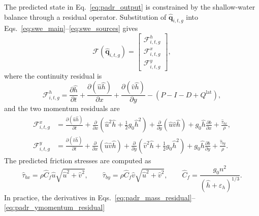 \documentclass[pdflatex,sn-mathphys-ay]{sn-jnl}
\theoremstyle{thmstyleone}
\begin{document}
The predicted state in Eq.~\eqref{eq:padr_output} is constrained by
the shallow-water balance through a residual operator.  Substitution of
$\hat{\mathbf{q}}_{i,t,g}$ into
Eqs.~\eqref{eq:swe_main}--\eqref{eq:swe_sources} gives
\begin{equation}
  \mathcal{F}
  \left(
    \hat{\mathbf{q}}_{i,t,g}
  \right)
  =
  \begin{bmatrix}
    \mathcal{F}^{h}_{i,t,g} \\
    \mathcal{F}^{x}_{i,t,g} \\
    \mathcal{F}^{y}_{i,t,g}
  \end{bmatrix},
  \label{eq:padr_residual_vector}
\end{equation}
where the continuity residual is
\begin{equation}
  \mathcal{F}^{h}_{i,t,g}
  =
  \frac{\partial \hat{h}}{\partial t}
  +
  \frac{\partial (\hat{u}\hat{h})}{\partial x}
  +
  \frac{\partial (\hat{v}\hat{h})}{\partial y}
  -
  \left(
    P-I-D+Q^{\mathrm{lat}}
  \right),
  \label{eq:padr_mass_residual}
\end{equation}
and the two momentum residuals are
\begin{align}
  \mathcal{F}^{x}_{i,t,g}
  &=
  \frac{\partial (\hat{u}\hat{h})}{\partial t}
  +
  \frac{\partial}{\partial x}
  \left(
    \hat{u}^{2}\hat{h}
    +
    \frac{1}{2}g_{0}\hat{h}^{2}
  \right)
  +
  \frac{\partial}{\partial y}
  \left(
    \hat{u}\hat{v}\hat{h}
  \right)
  +
  g_{0}\hat{h}
  \frac{\partial b}{\partial x}
  +
  \frac{\hat{\tau}_{bx}}{\rho},
  \label{eq:padr_xmomentum_residual}
  \\
  \mathcal{F}^{y}_{i,t,g}
  &=
  \frac{\partial (\hat{v}\hat{h})}{\partial t}
  +
  \frac{\partial}{\partial x}
  \left(
    \hat{u}\hat{v}\hat{h}
  \right)
  +
  \frac{\partial}{\partial y}
  \left(
    \hat{v}^{2}\hat{h}
    +
    \frac{1}{2}g_{0}\hat{h}^{2}
  \right)
  +
  g_{0}\hat{h}
  \frac{\partial b}{\partial y}
  +
  \frac{\hat{\tau}_{by}}{\rho}.
  \label{eq:padr_ymomentum_residual}
\end{align}
The predicted friction stresses are computed as
\begin{equation}
  \hat{\tau}_{bx}
  =
  \rho \hat{C}_{f}
  \hat{u}
  \sqrt{\hat{u}^{2}+\hat{v}^{2}},
  \qquad
  \hat{\tau}_{by}
  =
  \rho \hat{C}_{f}
  \hat{v}
  \sqrt{\hat{u}^{2}+\hat{v}^{2}},
  \qquad
  \hat{C}_{f}
  =
  \frac{g_{0}n^{2}}
  {(\hat{h}+\varepsilon_h)^{1/3}}.
  \label{eq:padr_friction}
\end{equation}
In practice, the derivatives in
Eqs.~\eqref{eq:padr_mass_residual}--\eqref{eq:padr_ymomentum_residual}
\end{document}
